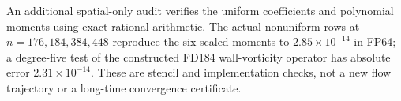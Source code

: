 An additional spatial-only audit verifies the uniform coefficients and polynomial moments using exact rational arithmetic. The actual nonuniform rows at $n=176,184,384,448$ reproduce the six scaled moments to $2.85\times10^{-14}$ in FP64; a degree-five test of the constructed FD184 wall-vorticity operator has absolute error $2.31\times10^{-14}$. These are stencil and implementation checks, not a new flow trajectory or a long-time convergence certificate.
